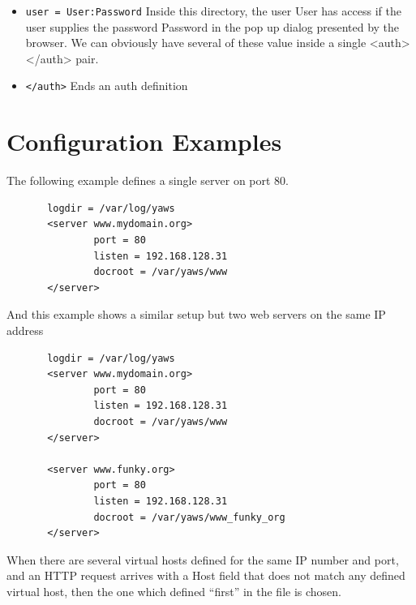\documentclass[11pt,oneside,english]{book}
\begin{document}
\begin{itemize}
\begin{itemize}
\item       \verb+user = User:Password+
              Inside this directory,  the  user  User  has
              access  if  the  user  supplies the password
              Password in the pop up dialog presented  by
              the  browser.  We can obviously have several
              of  these  value  inside  a  single   <auth>
              </auth> pair.

\item       \verb+</auth>+
              Ends an auth definition


\end{itemize}

\end{itemize}







\section{Configuration Examples}



       The  following  example  defines a single server on
       port 80.

\begin{verbatim}
       logdir = /var/log/yaws
       <server www.mydomain.org>
               port = 80
               listen = 192.168.128.31
               docroot = /var/yaws/www
       </server>

\end{verbatim}
       And this example shows a similar setup but two web­
       servers on the same IP address

\begin{verbatim}
       logdir = /var/log/yaws
       <server www.mydomain.org>
               port = 80
               listen = 192.168.128.31
               docroot = /var/yaws/www
       </server>

       <server www.funky.org>
               port = 80
               listen = 192.168.128.31
               docroot = /var/yaws/www_funky_org
       </server>

\end{verbatim}



When there are several
virtual hosts defined for the same IP number and port,
and an HTTP request arrives with a Host field that does
not match any defined virtual host, then the one which
defined ``first'' in the file is chosen.
\end{document}
